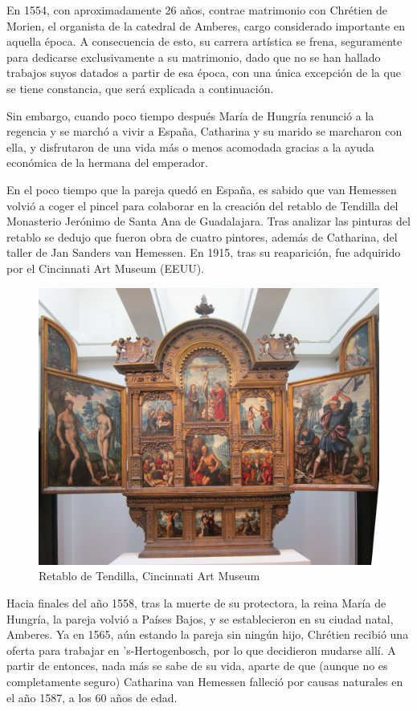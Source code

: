 \documentclass[12pt]{report}
\begin{document}
En 1554, con aproximadamente 26 años, contrae matrimonio con Chrétien de Morien, el organista de la catedral de Amberes, cargo considerado importante en aquella época. A consecuencia de esto, su carrera artística se frena, seguramente para dedicarse exclusivamente a su matrimonio, dado que no se han hallado trabajos suyos datados a partir de esa época, con una única excepción de la que se tiene constancia, que será explicada a continuación.\bigskip

Sin embargo, cuando poco tiempo después María de Hungría renunció a la regencia y se marchó a vivir a España, Catharina y su marido se marcharon con ella, y disfrutaron de una vida más o menos acomodada gracias a la ayuda económica de la hermana del emperador.\bigskip

En el poco tiempo que la pareja quedó en España, es sabido que van Hemessen volvió a coger el pincel para colaborar en la creación del retablo de Tendilla del Monasterio Jerónimo de Santa Ana de Guadalajara. Tras analizar las pinturas del retablo se dedujo que fueron obra de cuatro pintores, además de Catharina, del taller de Jan Sanders van Hemessen. En 1915, tras su reaparición, fue adquirido por el Cincinnati Art Museum (EEUU).\bigskip

\begin{figure}[h]
	\centering
	\includegraphics[width=0.75\linewidth]{retablo-de-tendilla}
	\caption{Retablo de Tendilla, Cincinnati Art Museum}
	\label{fig:wrapfig}
\end{figure}

Hacia finales del año 1558, tras la muerte de su protectora, la reina María de Hungría, la pareja volvió a Países Bajos, y se establecieron en su ciudad natal, Amberes. Ya en 1565, aún estando la pareja sin ningún hijo, Chrétien recibió una oferta para trabajar en 's-Hertogenbosch, por lo que decidieron mudarse allí. A partir de entonces, nada más se sabe de su vida, aparte de que (aunque no es completamente seguro) Catharina van Hemessen falleció por causas naturales en el año 1587, a los 60 años de edad.
\end{document}
